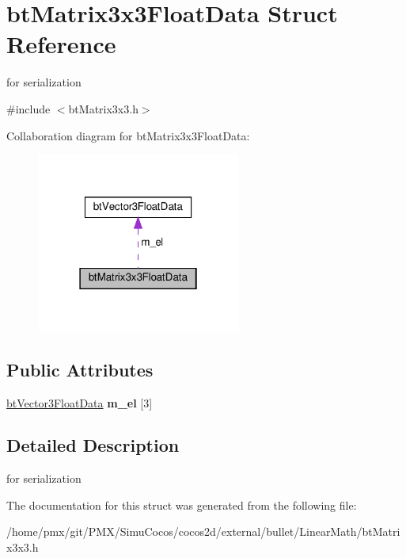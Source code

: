 \hypertarget{structbtMatrix3x3FloatData}{}\section{bt\+Matrix3x3\+Float\+Data Struct Reference}
\label{structbtMatrix3x3FloatData}


for serialization  




{\ttfamily \#include $<$bt\+Matrix3x3.\+h$>$}



Collaboration diagram for bt\+Matrix3x3\+Float\+Data\+:
\nopagebreak
\begin{figure}[H]
\begin{center}
\leavevmode
\includegraphics[width=190pt]{structbtMatrix3x3FloatData__coll__graph}
\end{center}
\end{figure}
\subsection*{Public Attributes}
\begin{DoxyCompactItemize}
\item 
\mbox{\label{structbtMatrix3x3FloatData_a642d6967ec684e3e564b9439c3a4255b}} 
\hyperlink{structbtVector3FloatData}{bt\+Vector3\+Float\+Data} {\bfseries m\+\_\+el} \mbox{[}3\mbox{]}
\end{DoxyCompactItemize}


\subsection{Detailed Description}
for serialization 

The documentation for this struct was generated from the following file\+:\begin{DoxyCompactItemize}
\item 
/home/pmx/git/\+P\+M\+X/\+Simu\+Cocos/cocos2d/external/bullet/\+Linear\+Math/bt\+Matrix3x3.\+h\end{DoxyCompactItemize}
